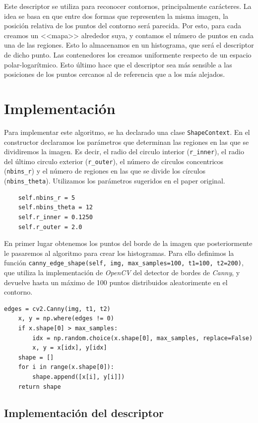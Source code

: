\documentclass[size=a4, parskip=half, titlepage=false, toc=flat, toc=bib, 12pt]{scrartcl}
\begin{document}
Este descriptor se utiliza para reconocer contornos, principalmente carácteres. La idea se basa en que entre dos formas que representen la misma imagen, la posición relativa de los puntos del contorno será parecida. Por esto, para cada creamos un <<mapa>> alrededor suya, y contamos el número de puntos en cada una de las regiones. Esto lo almacenamos en un histograma, que será el descriptor de dicho punto. Las contenedores los creamos uniformente respecto de un espacio polar-logarítmico. Esto último hace que el descriptor sea más sensible a las posiciones de los puntos cercanos al de referencia que a los más alejados.

\newpage

\section{Implementación}
Para implementar este algoritmo, se ha declarado una clase \verb|ShapeContext|. En el constructor declaramos los parámetros que determinan las regiones en las que se dividiremos la imagen. Es decir, el radio del circulo interior (\verb|r_inner|), el radio del último circulo exterior (\verb|r_outer|), el número de círculos concentricos (\verb|nbins_r|) y el número de regiones en las que se divide los círculos (\verb|nbins_theta|). Utilizamos los parámetros sugeridos en el paper original.

\begin{verbatim}
    self.nbins_r = 5
    self.nbins_theta = 12
    self.r_inner = 0.1250
    self.r_outer = 2.0
\end{verbatim}

En primer lugar obtenemos los puntos del borde de la imagen que posteriormente le pasaremos al algoritmo para crear los histogramas. Para ello definimos la función \texttt{canny\_edge\_shape(self, img, max\_samples=100, t1=100, t2=200)}, que utiliza la implementación de \textit{OpenCV} del detector de bordes de \textit{Canny}, y devuelve hasta un máximo de 100 puntos distribuidos aleatorimente en el contorno.

\begin{verbatim}
edges = cv2.Canny(img, t1, t2)
    x, y = np.where(edges != 0)
    if x.shape[0] > max_samples:
        idx = np.random.choice(x.shape[0], max_samples, replace=False)
        x, y = x[idx], y[idx]
    shape = []
    for i in range(x.shape[0]):
        shape.append([x[i], y[i]])
    return shape
\end{verbatim}

\subsection{Implementación del descriptor}%
\label{sub:implementación_del_descriptor}
\end{document}
